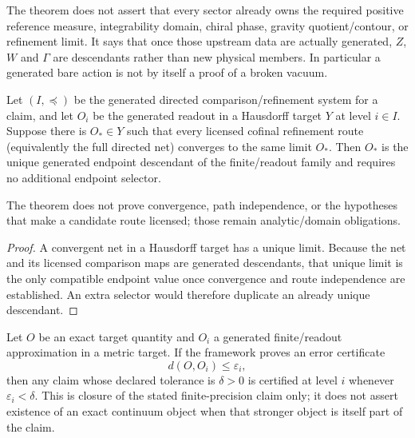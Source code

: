 \documentclass[12pt,a4paper]{article}
\begin{document}
\begin{remark}
\label{p12:rem:effective-action-constructor-firewall}
The theorem does not assert that every sector already owns the required
positive reference measure, integrability domain, chiral phase, gravity
quotient/contour, or refinement limit.  It says that once those upstream data
are actually generated, $Z$, $W$ and $\Gamma$ are descendants rather than new
physical members.  In particular a generated bare action is not by itself a
proof of a broken vacuum.
\end{remark}

\begin{theorem}
\label{p12:thm:canonical-limit-descendant}
Let $(I,\preceq)$ be the generated directed comparison/refinement system for a
claim, and let $O_i$ be the generated readout in a Hausdorff target $Y$ at
level $i\in I$.  Suppose there is $O_*\in Y$ such that every licensed cofinal
refinement route (equivalently the full directed net) converges to the same
limit $O_*$.  Then $O_*$ is the unique generated endpoint descendant of the
finite/readout family and requires no additional endpoint selector.

The theorem does not prove convergence, path independence, or the hypotheses
that make a candidate route licensed; those remain analytic/domain
obligations.
\end{theorem}

\begin{proof}
A convergent net in a Hausdorff target has a unique limit.  Because the net
and its licensed comparison maps are generated descendants, that unique limit
is the only compatible endpoint value once convergence and route independence
are established.  An extra selector would therefore duplicate an already
unique descendant.
\end{proof}

\begin{corollary}
\label{p12:cor:certified-finite-precision-closure}
Let $O$ be an exact target quantity and $O_i$ a generated finite/readout
approximation in a metric target.  If the framework proves an error certificate
\[
 d(O,O_i)\le\varepsilon_i,
\]
then any claim whose declared tolerance is $\delta>0$ is certified at level
$i$ whenever $\varepsilon_i<\delta$.  This is closure of the stated
finite-precision claim only; it does not assert existence of an exact
continuum object when that stronger object is itself part of the claim.
\end{corollary}
\end{document}
